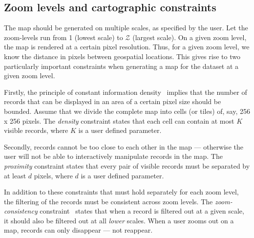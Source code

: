 \subsection{Zoom levels and cartographic constraints}
\label{sec:zoomlevels}



The map should be generated on multiple scales, as specified by the user. Let the zoom-levels run from 1 (lowest scale) to $\mathcal{Z}$ (largest scale). On a given zoom level, the map is rendered at a certain pixel resolution. Thus, for a given zoom level, we know the distance in pixels between geospatial locations. This gives rise to two particularly important constraints when generating a map for the dataset at a given zoom level.


Firstly, the principle of constant information density~\cite{topfer1966principles} implies that the number of records that can be displayed in an area of a certain pixel size should be bounded. Assume that we divide the complete map into cells (or tiles) of, say, 256 x 256 pixels. The \emph{density} constraint states that each cell can contain at most $K$ visible records, where $K$ is a user defined parameter.



Secondly, records cannot be too close to each other in the map --- otherwise the user will not be able to interactively manipulate records in the map. The \emph{proximity} constraint states that every pair of visible records must be separated by at least $d$ pixels, where $d$ is a user defined parameter.

In addition to these constraints that must hold separately for each zoom level, the filtering of the records must be consistent across zoom levels. The \emph{zoom-consistency} constraint~\cite{sarma2012fusiontables} states that when a record is filtered out at a given scale, it should also be filtered out at all \emph{lower} scales. When a user zooms out on a map, records can only disappear --- not reappear.

